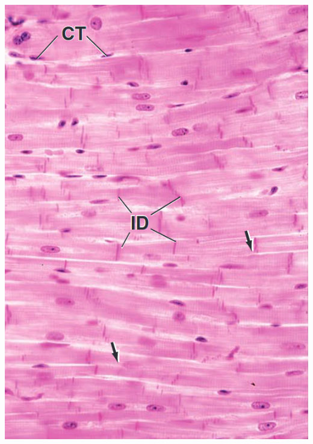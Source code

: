 \begin{itemize}
\begin{itemize}
    \end{itemize}
  \begin{center}
    \includegraphics[scale=0.18]{images/week-1-rp7.jpg}

\end{center}
\end{itemize}
